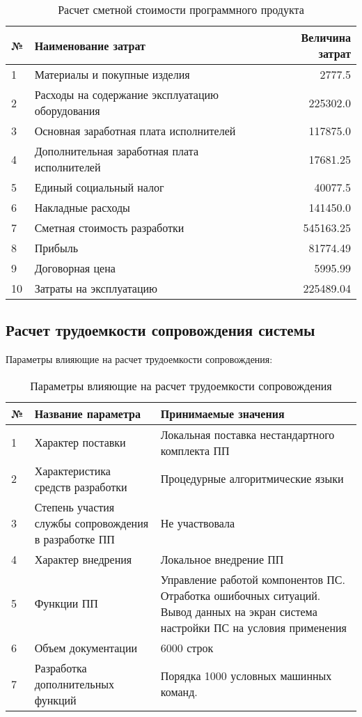 \begin{table}
\caption{Расчет сметной стоимости программного продукта}
\begin{tabular}{|l|p{12cm}|r|}
\hline{}
№ & Наименование затрат & Величина затрат \\
\hline{}
1 & Материалы и покупные изделия & 2777.5 \\
\hline{}
2 & Расходы на содержание эксплуатацию оборудования & 225302.0 \\
\hline{}
3 & Основная заработная плата исполнителей & 117875.0 \\
\hline{}
4 & Дополнительная заработная плата исполнителей & 17681.25 \\
\hline{}
5 & Единый социальный налог & 40077.5 \\
\hline{}
6 & Накладные расходы & 141450.0 \\
\hline{}
7 & Сметная стоимость разработки & 545163.25 \\
\hline{}
8 & Прибыль & 81774.49 \\
\hline{}
9 & Договорная цена & 5995.99 \\
\hline{}
10 & Затраты на эксплуатацию & 225489.04 \\
\hline
\end{tabular}
\label{table:softwareCost}
\end{table}



\subsection{Расчет трудоемкости сопровождения системы}
Параметры влияющие на расчет трудоемкости сопровождения:
\begin{table}
\caption{Параметры влияющие на расчет трудоемкости сопровождения}
\begin{tabular}{|l|p{8cm}|p{8cm}|}
\hline{}
№ & Название параметра & Принимаемые значения \\
\hline{}
1 & Характер поставки & Локальная поставка нестандартного комплекта ПП \\
\hline{}
2 & Характеристика средств разработки & Процедурные алгоритмические языки \\
\hline{}
3 & Степень участия службы сопровождения в разработке ПП & Не участвовала \\
\hline{}
4 & Характер внедрения & Локальное внедрение ПП \\
\hline{}
5 & Функции ПП & Управление работой компонентов ПС. Отработка ошибочных ситуаций.
Вывод данных на экран система настройки ПС на условия применения \\
\hline{}
6 & Объем документации & 6000 строк \\
\hline{}
7 & Разработка дополнительных функций & Порядка 1000 условных машинных команд. \\
\hline
\end{tabular}
\label{table:supportFactors}
\end{table}


